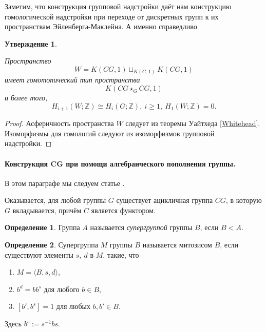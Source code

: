 \documentclass[14pt, dvipsnames]{extarticle}
\newtheorem{statement}{Утверждение}
\theoremstyle{definition}
\newtheorem{defi}{Определение}
\theoremstyle{remark}
\begin{document}
Заметим, что конструкция групповой надстройки даёт нам конструкцию гомологической надстройки при переходе от дискретных групп к их пространствам Эйленберга-Маклейна. А именно справедливо

\begin{statement}\label{wh}

Пространство $$W=K(CG, 1)\sqcup_{K(G, 1)} K(CG, 1)$$ имеет гомотопический тип пространства $$K(CG\star_{G} CG, 1)$$ и более того, $$H_{i+1}(W; \mathbb{Z})\cong H_i(G; \mathbb{Z}), \ i\geqslant 1,\ H_1(W; \mathbb{Z})=0.$$

\end{statement}

\begin{proof}
Асферичность пространства $W$ следует из теоремы Уайтхеда \ref{Whitehead}. Изоморфизмы для гомологий следуют из изоморфизмов групповой надстройки.
\end{proof}














\paragraph{Конструкция $\bm{CG}$ при помощи алгебраического пополнения группы.}

В этом параграфе мы следуем статье \cite{BDH}.

Оказывается, для любой группы $G$ существует ацикличная группа $CG$, в которую $G$ вкладывается, причём $C$ является функтором.

\begin{defi}
Группа $A$ называется {\it супергруппой} группы $B$, если $B<A$. 
\end{defi}

\begin{defi}
Супергруппа $M$ группы $B$ называется митозисом $B$, если существуют элементы $s,\ d$ в $M$, такие, что 

\begin{enumerate}[\bf 1.]
\item $M=\langle B, s, d\rangle$,
\item $b^d=bb^s$ для любого $b\in B$,
\item $[b', b^s]=1$ для любых $b, b'\in B$.
\end{enumerate}
Здесь $b^s:=s^{-1}bs$.
\end{defi}
\end{document}
